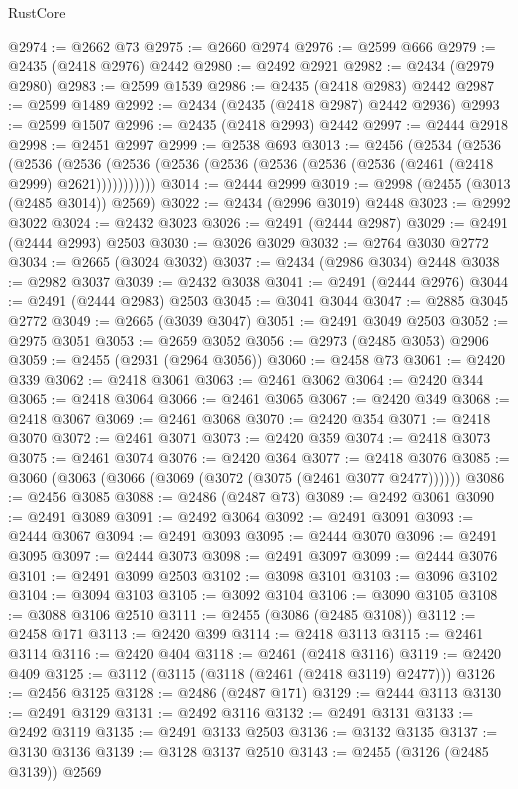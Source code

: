 \begin{lexlean}{RustCore}
\begin{coremodule}
@2974 := @2662 @73
@2975 := @2660 @2974
@2976 := @2599 @666
@2979 := @2435 (@2418 @2976) @2442
@2980 := @2492 @2921
@2982 := @2434 (@2979 @2980)
@2983 := @2599 @1539
@2986 := @2435 (@2418 @2983) @2442
@2987 := @2599 @1489
@2992 := @2434 (@2435 (@2418 @2987) @2442 @2936)
@2993 := @2599 @1507
@2996 := @2435 (@2418 @2993) @2442
@2997 := @2444 @2918
@2998 := @2451 @2997
@2999 := @2538 @693
@3013 := @2456
    (@2534
      (@2536
        (@2536
          (@2536 (@2536 (@2536 (@2536 (@2536 (@2536 (@2536 (@2461 (@2418 @2999) @2621)))))))))))
@3014 := @2444 @2999
@3019 := @2998 (@2455 (@3013 (@2485 @3014)) @2569)
@3022 := @2434 (@2996 @3019) @2448
@3023 := @2992 @3022
@3024 := @2432 @3023
@3026 := @2491 (@2444 @2987)
@3029 := @2491 (@2444 @2993) @2503
@3030 := @3026 @3029
@3032 := @2764 @3030 @2772
@3034 := @2665 (@3024 @3032)
@3037 := @2434 (@2986 @3034) @2448
@3038 := @2982 @3037
@3039 := @2432 @3038
@3041 := @2491 (@2444 @2976)
@3044 := @2491 (@2444 @2983) @2503
@3045 := @3041 @3044
@3047 := @2885 @3045 @2772
@3049 := @2665 (@3039 @3047)
@3051 := @2491 @3049 @2503
@3052 := @2975 @3051
@3053 := @2659 @3052
@3056 := @2973 (@2485 @3053) @2906
@3059 := @2455 (@2931 (@2964 @3056))
@3060 := @2458 @73
@3061 := @2420 @339
@3062 := @2418 @3061
@3063 := @2461 @3062
@3064 := @2420 @344
@3065 := @2418 @3064
@3066 := @2461 @3065
@3067 := @2420 @349
@3068 := @2418 @3067
@3069 := @2461 @3068
@3070 := @2420 @354
@3071 := @2418 @3070
@3072 := @2461 @3071
@3073 := @2420 @359
@3074 := @2418 @3073
@3075 := @2461 @3074
@3076 := @2420 @364
@3077 := @2418 @3076
@3085 := @3060 (@3063 (@3066 (@3069 (@3072 (@3075 (@2461 @3077 @2477))))))
@3086 := @2456 @3085
@3088 := @2486 (@2487 @73)
@3089 := @2492 @3061
@3090 := @2491 @3089
@3091 := @2492 @3064
@3092 := @2491 @3091
@3093 := @2444 @3067
@3094 := @2491 @3093
@3095 := @2444 @3070
@3096 := @2491 @3095
@3097 := @2444 @3073
@3098 := @2491 @3097
@3099 := @2444 @3076
@3101 := @2491 @3099 @2503
@3102 := @3098 @3101
@3103 := @3096 @3102
@3104 := @3094 @3103
@3105 := @3092 @3104
@3106 := @3090 @3105
@3108 := @3088 @3106 @2510
@3111 := @2455 (@3086 (@2485 @3108))
@3112 := @2458 @171
@3113 := @2420 @399
@3114 := @2418 @3113
@3115 := @2461 @3114
@3116 := @2420 @404
@3118 := @2461 (@2418 @3116)
@3119 := @2420 @409
@3125 := @3112 (@3115 (@3118 (@2461 (@2418 @3119) @2477)))
@3126 := @2456 @3125
@3128 := @2486 (@2487 @171)
@3129 := @2444 @3113
@3130 := @2491 @3129
@3131 := @2492 @3116
@3132 := @2491 @3131
@3133 := @2492 @3119
@3135 := @2491 @3133 @2503
@3136 := @3132 @3135
@3137 := @3130 @3136
@3139 := @3128 @3137 @2510
@3143 := @2455 (@3126 (@2485 @3139)) @2569

\end{coremodule}
\end{lexlean}
